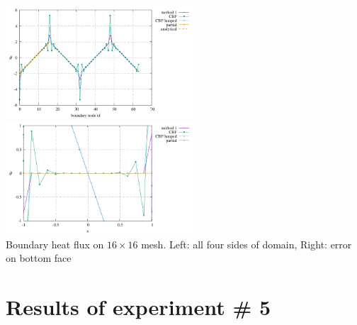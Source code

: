 \begin{center}
\includegraphics[width=7cm]{python_codes/fieldstone_173/results/exp4/heat_flux_boundary.pdf}
\includegraphics[width=7cm]{python_codes/fieldstone_173/results/exp4/heat_flux_boundary_bottom.pdf}\\
{\captionfont Boundary heat flux on $16 \times 16$ mesh. Left: all four 
sides of domain, Right: error on bottom face}
\end{center}







\newpage
\section*{Results of experiment \# 5}

